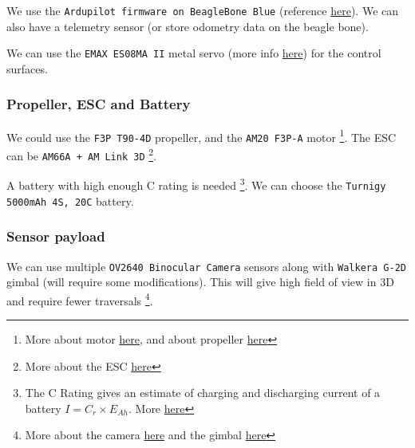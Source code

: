 We use the \texttt{Ardupilot firmware on BeagleBone Blue} (reference \href{https://ardupilot.org/plane/docs/common-beagle-bone-blue.html}{here}). We can also have a telemetry sensor (or store odometry data on the beagle bone).

We can use the \texttt{EMAX ES08MA II} metal servo (more info \href{https://emaxmodel.com/products/emax-es08ma-ii-12g-mini-metal-gear-analog-servo-for-rc-model-robot-pwm-servo}{here}) for the control surfaces.

\subsubsection*{Propeller, ESC and Battery}

We could use the \texttt{F3P T90-4D} propeller, and the \texttt{AM20 F3P-A} motor \footnote{More about motor \href{http://en.tmotorhobby.com/goods.php?id=1137}{here}, and about propeller \href{https://store.tmotor.com/goods.php?id=1077}{here}}. The ESC can be \texttt{AM66A + AM Link 3D} \footnote{More about the ESC \href{https://store.tmotor.com/goods.php?id=1173}{here}}.

A battery with high enough C rating is needed \footnote{The C Rating gives an estimate of charging and discharging current of a battery $I = C_{r} \times E_{Ah}$. More \href{https://www.power-sonic.com/blog/what-is-a-battery-c-rating/}{here}}. We can choose the \texttt{Turnigy 5000mAh 4S, 20C} battery.

\subsubsection*{Sensor payload}

We can use multiple \texttt{OV2640 Binocular Camera} sensors along with \texttt{Walkera G-2D} gimbal (will require some modifications). This will give high field of view in 3D and require fewer traversals \footnote{More about the camera \href{https://robu.in/product/ov2640-binocular-camera-module-cmos-stm32-driver-3-3v-16001200-for-3d-measurement-with-sccb-interface/?gclid=CjwKCAjwjZmTBhB4EiwAynRmDwSvD0T3b_5tGSfUsN1u4SkNTamfwdZwLdCYZd_c6w4zhIOolFD22hoCSK0QAvD_BwE}{here} and the gimbal \href{http://www.ehirobo.com/walkera-wk-g-2d-brushless-camera-gimbal.html}{here}}.


